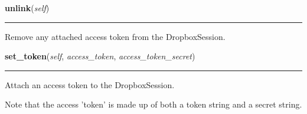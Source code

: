     \label{lib:dropbox:DropboxSession:unlink}

    \vspace{0.5ex}

\hspace{.8\funcindent}\begin{boxedminipage}{\funcwidth}

    \raggedright \textbf{unlink}(\textit{self})

    \vspace{-1.5ex}

    \rule{\textwidth}{0.5\fboxrule}
\setlength{\parskip}{2ex}
    Remove any attached access token from the DropboxSession.

\setlength{\parskip}{1ex}
    \end{boxedminipage}

    \label{lib:dropbox:DropboxSession:set_token}

    \vspace{0.5ex}

\hspace{.8\funcindent}\begin{boxedminipage}{\funcwidth}

    \raggedright \textbf{set\_token}(\textit{self}, \textit{access\_token}, \textit{access\_token\_secret})

    \vspace{-1.5ex}

    \rule{\textwidth}{0.5\fboxrule}
\setlength{\parskip}{2ex}
    Attach an access token to the DropboxSession.

    Note that the access 'token' is made up of both a token string and a 
    secret string.

\setlength{\parskip}{1ex}
    \end{boxedminipage}

    \label{lib:dropbox:DropboxSession:set_request_token}

    \vspace{0.5ex}

